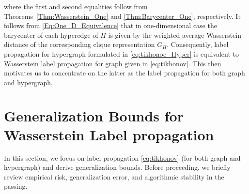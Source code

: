 \documentclass[letterpaper]{article} %
\begin{document}
where the first and second equalities follow from Theorems~\ref{Thm:Wasserstein_One} and \ref{Thm:Barycenter_One}, respectively. It follows from \eqref{Eq:One_D_Equivalence} that in one-dimensional case the barycenter of each hyperedge of $H$ is given by the weighted average Wasserstein distance of the corresponding clique representation $G_H$. Consequently, label propagation for hypergraph formulated in \eqref{eq:tikhonoc_Hyper} is 
equivalent to Wasserstein label propagation for graph given in  \eqref{eq:tikhonov}. This then motivates us to concentrate on the latter as the label propagation for both graph and hypergraph.

\section{Generalization Bounds for Wasserstein Label propagation}
In this section, we focus on label propagation \eqref{eq:tikhonov} (for both graph and hypergraph) and derive generalization bounds. Before proceeding, we briefly review empirical risk, generalization error, and algorithmic stability in the passing.
\end{document}
